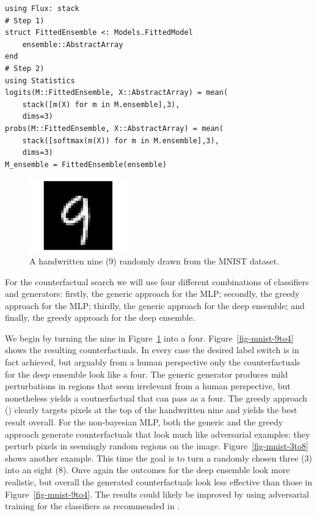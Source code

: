 \documentclass[
  letterpaper,
  DIV=11,
  numbers=noendperiod]{scrartcl}
\begin{document}
\begin{lstlisting}
using Flux: stack
# Step 1)
struct FittedEnsemble <: Models.FittedModel
    ensemble::AbstractArray
end
# Step 2)
using Statistics
logits(M::FittedEnsemble, X::AbstractArray) = mean(
    stack([m(X) for m in M.ensemble],3), 
    dims=3)
probs(M::FittedEnsemble, X::AbstractArray) = mean(
    stack([softmax(m(X)) for m in M.ensemble],3),
    dims=3)
M_ensemble = FittedEnsemble(ensemble)
\end{lstlisting}

\begin{figure}

{\centering \includegraphics[width=1.66667in,height=1.25in]{www/mnist_original.png}

}

\caption{\label{fig-mnist-orig}A handwritten nine (9) randomly drawn
from the MNIST dataset.}

\end{figure}

For the counterfactual search we will use four different combinations of
classifiers and generators: firstly, the generic approach for the MLP;
secondly, the greedy approach for the MLP; thirdly, the generic approach
for the deep ensemble; and finally, the greedy approach for the deep
ensemble.

We begin by turning the nine in Figure~\ref{fig-mnist-orig} into a four.
Figure~\ref{fig-mnist-9to4} shows the resulting counterfactuals. In
every case the desired label switch is in fact achieved, but arguably
from a human perspective only the counterfactuals for the deep ensemble
look like a four. The generic generator produces mild perturbations in
regions that seem irrelevant from a human perspective, but nonetheless
yields a coutnerfactual that can pass as a four. The greedy approach
(\cite{wacther2021generating}) clearly targets pixels at the top of the
handwritten nine and yields the best result overall. For the
non-bayesian MLP, both the generic and the greedy approach generate
counterfactuals that look much like adversarial examples: they perturb
pixels in seemingly random regions on the image.
Figure~\ref{fig-mnist-3to8} shows another example. This time the goal is
to turn a randomly chosen three (3) into an eight (8). Onve again the
outcomes for the deep ensemble look more realistic, but overall the
generated counterfactuals look less effective than those in
Figure~\ref{fig-mnist-9to4}. The results could likely be improved by
using adversarial training for the classifiers as recommended in
\cite{schut2021generating}.
\end{document}

